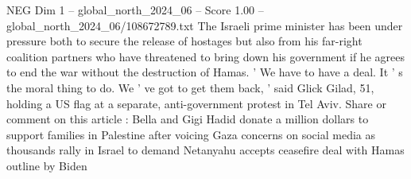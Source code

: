 \begin{textsample}{NEG Dim 1 – global\_north\_2024\_06 – Score 1.00 – global\_north\_2024\_06/108672789.txt}
The Israeli prime minister has been under pressure both to secure the release of hostages but also from his far-right coalition partners who have threatened to bring down his government if he agrees to end the war without the destruction of Hamas. ' We have to have a deal.
It ' s the moral thing to do.
We ' ve got to get them back, ' said Glick Gilad, 51, holding a US flag at a separate, anti-government protest in Tel Aviv.
Share or comment on this article : Bella and Gigi Hadid donate a million dollars to support families in Palestine after voicing Gaza concerns on social media as thousands rally in Israel to demand Netanyahu accepts ceasefire deal with Hamas outline by Biden

\end{textsample}
